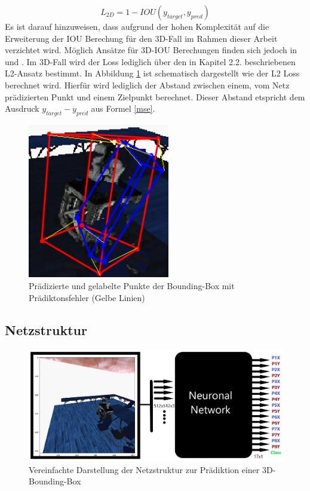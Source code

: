 \begin{equation}\label{iouloss}
	L_{2D}= 1-IOU(y_{target},y_{pred})
\end{equation} 
Es ist darauf hinzuweisen, dass aufgrund der hohen Komplexität auf die Erweiterung der IOU Berechung für den 3D-Fall im Rahmen dieser Arbeit verzichtet wird. Möglich Ansätze für 3D-IOU Berechungen finden sich jedoch in \cite{Xu2019} und \cite{Mousavian1612}. Im 3D-Fall wird der Loss lediglich über den in Kapitel 2.2. beschriebenen L2-Ansatz bestimmt. In Abbildung \ref{L2_loss_graphik} ist schematisch dargestellt wie der L2 Loss berechnet wird. Hierfür wird lediglich der Abstand zwischen einem, vom Netz prädizierten Punkt und einem Zielpunkt berechnet. Dieser Abstand etspricht dem Ausdruck $y_{target}-y_{pred}$ aus Formel \ref{mse}. 
\begin{figure}[!htb]
  \centering
  \includegraphics[width=6.2cm]{Abb/l2_loss_bei3d_bb.png}
  \caption{Prädizierte und gelabelte Punkte der Bounding-Box mit Prädiktonsfehler (Gelbe Linien)}
  \label{L2_loss_graphik}
\end{figure} 
\newpage
\subsection{Netzstruktur}

\begin{figure}[!htb]
  \centering
  \includegraphics[width=13.8cm]{Abb/Modell_struktur.png}
  \caption{Vereinfachte Darstellung der Netzstruktur zur Prädiktion einer 3D-Bounding-Box}
  \label{grobe_netz_struktur}
\end{figure} 

